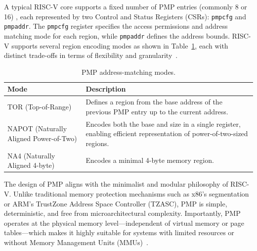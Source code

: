 A typical RISC-V core supports a fixed number of PMP entries (commonly 8 or 16) \cite{keystone2025how}, each represented by two Control and Status Registers (CSRs): \texttt{pmpcfg} and \texttt{pmpaddr}. The \texttt{pmpcfg} register specifies the access permissions and address matching mode for each region, while \texttt{pmpaddr} defines the address bounds. RISC-V supports several region encoding modes as shown in Table~\ref{tab:pmp-modes}, each with distinct trade-offs in terms of flexibility and granularity~\cite{riscvprivspec}.


\begin{table}[htbp]
\centering
\caption{PMP address-matching modes.}
\label{tab:pmp-modes}
\begin{tabular}{@{}lp{9cm}@{}} %
\toprule
\textbf{Mode} & \textbf{Description} \\ \midrule
TOR   (Top-of-Range) & Defines a region from the base address of the previous PMP entry up to the current address. \\
NAPOT (Naturally Aligned Power-of-Two) & Encodes both the base and size in a single register, enabling efficient representation of power-of-two-sized regions. \\
NA4   (Naturally Aligned 4-byte) & Encodes a minimal 4-byte memory region. \\
\bottomrule
\end{tabular}
\end{table}

The design of PMP aligns with the minimalist and modular philosophy of RISC-V. Unlike traditional memory protection mechanisms such as x86's segmentation or ARM's TrustZone Address Space Controller (TZASC), PMP is simple, deterministic, and free from microarchitectural complexity. Importantly, PMP operates at the physical memory level—independent of virtual memory or page tables—which makes it highly suitable for systems with limited resources or without Memory Management Units (MMUs)~\cite{riscvprivspec,Survey2023}.

